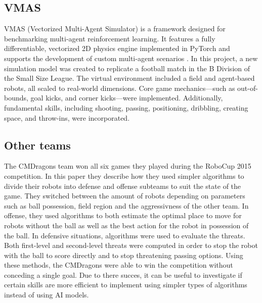 \subsection{VMAS}
VMAS (Vectorized Multi-Agent Simulator) is a framework designed for benchmarking multi-agent reinforcement learning. It features a fully differentiable, vectorized 2D physics engine implemented in PyTorch and supports the development of custom multi-agent scenarios \cite{bettini2022vmas}. In this project, a new simulation model was created to replicate a football match in the B Division of the Small Size League. The virtual environment included a field and agent-based robots, all scaled to real-world dimensions. Core game mechanics—such as out-of-bounds, goal kicks, and corner kicks—were implemented. Additionally, fundamental skills, including shooting, passing, positioning, dribbling, creating space, and throw-ins, were incorporated.

\subsection{Other teams}
The CMDragons team won all six games they played during the RoboCup 2015 competition. In this paper they 
describe how they used simpler algorithms to divide their robots into defense and offense subteams to suit the state 
of the game. They switched between the amount of robots depending on parameters such as ball possession, 
field region and the aggressivness of the other team. In offense, they used algorithms to both estimate the 
optimal place to move for robots without the ball as well as the best action for the robot in possession of the 
ball. In defensive situations, algorithms were used to evaluate the threats. Both first-level and second-level 
threats were computed in order to stop the robot with the ball to score directly and to stop threatening passing 
options. Using these methods, the CMDragons were able to win the competition without conceding a single goal\cite{CMDragons2015}.
Due to there succes, it can be useful to investigate if certain skills are more efficient to implement using simpler
types of algorithms instead of using AI models. 
